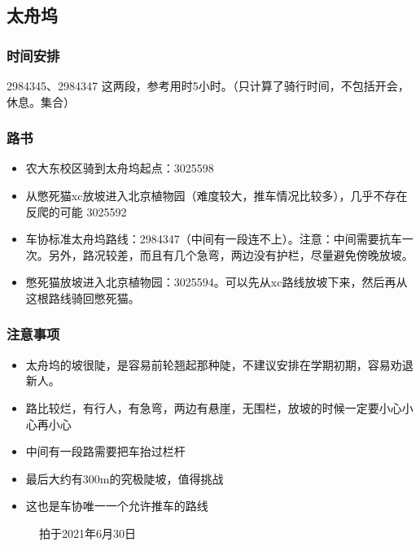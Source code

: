 \documentclass{ctexbook}
\begin{document}
\subsection{太舟坞}
\subsubsection{时间安排}
2984345、2984347 这两段，参考用时5小时。（只计算了骑行时间，不包括开会，休息。集合）
\subsubsection{路书}
\begin{itemize}
    \item 农大东校区骑到太舟坞起点：3025598
    \item 从憋死猫xc放坡进入北京植物园（难度较大，推车情况比较多），几乎不存在反爬的可能 3025592
    \item 车协标准太舟坞路线：2984347（中间有一段连不上）。注意：中间需要抗车一次。另外，路况较差，而且有几个急弯，两边没有护栏，尽量避免傍晚放坡。
    \item 憋死猫放坡进入北京植物园：3025594。可以先从xc路线放坡下来，然后再从这根路线骑回憋死猫。
\end{itemize}
\subsubsection{注意事项}
\begin{itemize}
    \item 太舟坞的坡很陡，是容易前轮翘起那种陡，不建议安排在学期初期，容易劝退新人。
    \item 路比较烂，有行人，有急弯，两边有悬崖，无围栏，放坡的时候一定要小心小心再小心
    \item 中间有一段路需要把车抬过栏杆
    \item 最后大约有300m的究极陡坡，值得挑战
    \item 这也是车协唯一一个允许推车的路线
\end{itemize}
\begin{figure}[!htb]
    \centering
       \quad 
        \caption{拍于2021年6月30日}
  \end{figure}
\end{document}
